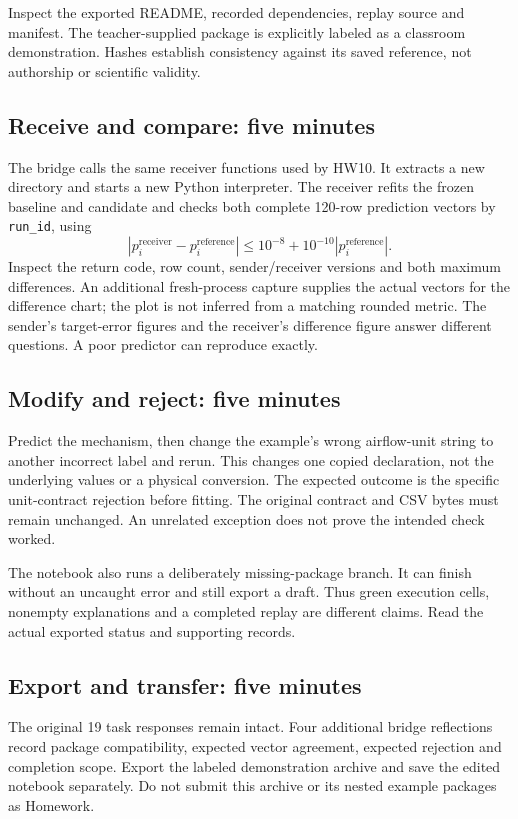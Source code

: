Inspect the exported README, recorded dependencies, replay source and manifest. The teacher-supplied package is explicitly labeled as a classroom demonstration. Hashes establish consistency against its saved reference, not authorship or scientific validity.

\subsection{Receive and compare: five minutes}
The bridge calls the same receiver functions used by HW10. It extracts a new directory and starts a new Python interpreter. The receiver refits the frozen baseline and candidate and checks both complete 120-row prediction vectors by \texttt{run\_id}, using
\[
 |p_i^{\mathrm{receiver}}-p_i^{\mathrm{reference}}|
 \leq 10^{-8}+10^{-10}|p_i^{\mathrm{reference}}|.
\]
Inspect the return code, row count, sender/receiver versions and both maximum differences. An additional fresh-process capture supplies the actual vectors for the difference chart; the plot is not inferred from a matching rounded metric. The sender's target-error figures and the receiver's difference figure answer different questions. A poor predictor can reproduce exactly.

\subsection{Modify and reject: five minutes}
Predict the mechanism, then change the example's wrong airflow-unit string to another incorrect label and rerun. This changes one copied declaration, not the underlying values or a physical conversion. The expected outcome is the specific unit-contract rejection before fitting. The original contract and CSV bytes must remain unchanged. An unrelated exception does not prove the intended check worked.

The notebook also runs a deliberately missing-package branch. It can finish without an uncaught error and still export a draft. Thus green execution cells, nonempty explanations and a completed replay are different claims. Read the actual exported status and supporting records.

\subsection{Export and transfer: five minutes}
The original 19 task responses remain intact. Four additional bridge reflections record package compatibility, expected vector agreement, expected rejection and completion scope. Export the labeled demonstration archive and save the edited notebook separately. Do not submit this archive or its nested example packages as Homework.

